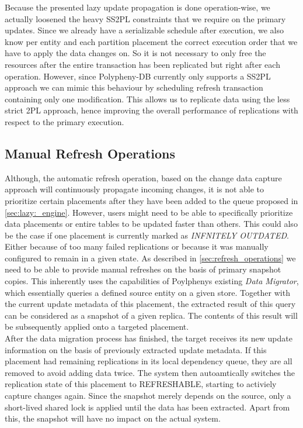 Because the presented lazy update propagation is done operation-wise, we actually loosened the heavy SS2PL constraints that we require on the primary updates. 
Since we already have a serializable schedule after execution, we also know per entity and each partition placement 
the correct execution order that we have to apply the data changes on. So it is not necessary to only free the resources 
after the entire transaction has been replicated but right after each operation. 
However, since Polypheny-DB currently only supports a SS2PL approach we can 
mimic this behaviour by scheduling refresh transaction containing only one modification.
This allows us to replicate data using the less strict 2PL approach, hence improving the overall performance of replications with respect to the primary execution.



\subsection{Manual Refresh Operations}
\label{sec:manual_refresh}

Although, the automatic refresh operation, based on the change data capture approach will continuously propagate incoming changes,
it is not able to prioritize certain placements after they have been added to the queue proposed in \ref{sec:lazy:_engine}.
However, users might need to be able to specifically prioritize data placements or entire tables to be updated faster than others. 
This could also be the case if one placement is currently marked as \emph{INFNITELY OUTDATED}.
Either because of too many failed replications or because it was manually configured to remain in a given state. 
As described in \ref{sec:refresh_operations} we need to be able to provide manual refreshes on the basis of primary snapshot copies.
This inherently uses the capabilities of Poylphenys existing \emph{Data Migrator}, which essentially queries a defined source entity on a given store. 
Together with the current update metadata of this placement, the extracted result of this query can be considered as a snapshot of a given replica.
The contents of this result will be subsequently applied onto a targeted placement.\\
After the data migration process has finished, the target receives its new update information on the basis of previously extracted update metadata.
If this placement had remaining replications in its local dependency queue, they are all removed to avoid adding data twice. 
The system then autoamtically switches the replication state of this placement to REFRESHABLE, starting to activiely capture changes again.
Since the snapshot merely depends on the source, only a short-lived shared lock is applied until the data has been extracted. Apart from this, the snapshot will have no impact
on the actual system.\\


